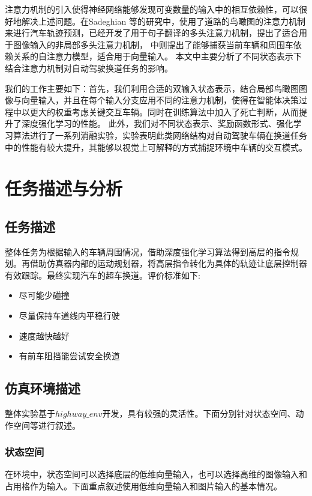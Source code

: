 \documentclass[letterpaper, 10 pt, conference]{ieeeconf}  %
\begin{document}
注意力机制的引入使得神经网络能够发现可变数量的输入中的相互依赖性，可以很好地解决上述问题。在Sadeghian 等\cite{sadeghian2018car}的研究中，使用了道路的鸟瞰图的注意力机制来进行汽车轨迹预测，\cite{vaswani2017attention}已经开发了用于句子翻译的多头注意力机制，\cite{messaoud2019non}提出了适合用于图像输入的非局部多头注意力机制，\cite{leurent2019social}
中则提出了能够捕获当前车辆和周围车依赖关系的自注意力模型，适合用于向量输入。
本文中主要分析了不同状态表示下结合注意力机制对自动驾驶换道任务的影响。

我们的工作主要如下：首先，我们利用合适的双输入状态表示，结合局部鸟瞰图图像与向量输入，并且在每个输入分支应用不同的注意力机制，使得在智能体决策过程中以更大的权重考虑关键交互车辆。同时在训练算法中加入了死亡判断，从而提升了深度强化学习的性能。
此外，我们对不同状态表示、奖励函数形式、强化学习算法进行了一系列消融实验，实验表明此类网络结构对自动驾驶车辆在换道任务中的性能有较大提升，其能够以视觉上可解释的方式捕捉环境中车辆的交互模式。


\section{任务描述与分析}

\subsection{任务描述}

整体任务为根据输入的车辆周围情况，借助深度强化学习算法得到高层的指令规划。再借助仿真器内部的运动规划器，将高层指令转化为具体的轨迹让底层控制器有效跟踪。最终实现汽车的超车换道。评价标准如下:
\begin{itemize}
    \item 尽可能少碰撞
    \item 尽量保持车道线内平稳行驶
    \item 速度越快越好
    \item 有前车阻挡能尝试安全换道
\end{itemize}

\subsection{仿真环境描述}
整体实验基于$highway\_env$\cite{highway-env}开发，具有较强的灵活性。下面分别针对状态空间、动作空间等进行叙述。
\subsubsection{状态空间}
在环境中，状态空间可以选择底层的低维向量输入，也可以选择高维的图像输入和占用格作为输入。下面重点叙述使用低维向量输入和图片输入的基本情况。
\end{document}
